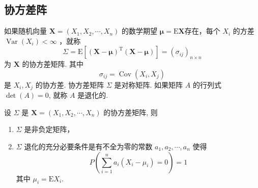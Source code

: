\subsection{协方差阵}
\begin{definition}[协方差矩阵]
    如果随机向量 $\boldsymbol{X}=\left(X_1, X_2, \cdots, X_n\right)$ 的数学期望 $\boldsymbol{\mu}=\mathrm{E} \boldsymbol{X}$存在，每个 $X_i$ 的方差 $\operatorname{Var}\left(X_i\right)<\infty$ ，就称
    $$
        \Sigma=\mathrm{E}\left[(\boldsymbol{X}-\boldsymbol{\mu})^{\mathrm{T}}(\boldsymbol{X}-\boldsymbol{\mu})\right]=\left(\sigma_{i j}\right)_{n \times n}
    $$
    为 $\boldsymbol{X}$ 的协方差矩阵. 其中
    $$
        \sigma_{i j}=\operatorname{Cov}\left(X_i, X_j\right)
    $$
    是 $X_i, X_j$ 的协方差.
    协方差矩阵 $\Sigma$ 是对称矩阵.
    如果矩阵 $A$ 的行列式 $\operatorname{det}(A)=0$, 就称 $A$ 是退化的.
\end{definition}
\begin{theorem}
    设 $\Sigma$ 是 $\boldsymbol{X}=\left(X_1, X_2, \cdots, X_n\right)$ 的协方差矩阵, 则
    \begin{enumerate}
        \item $\Sigma$ 是非负定矩阵，
        \item $\Sigma$ 退化的充分必要条件是有不全为零的常数 $a_1, a_2, \cdots, a_n$ 使得
              $$
                  P\left(\sum_{i=1}^n a_i\left(X_i-\mu_i\right)=0\right)=1
              $$
              其中 $\mu_i=\mathrm{E} X_i$.
    \end{enumerate}
\end{theorem}

